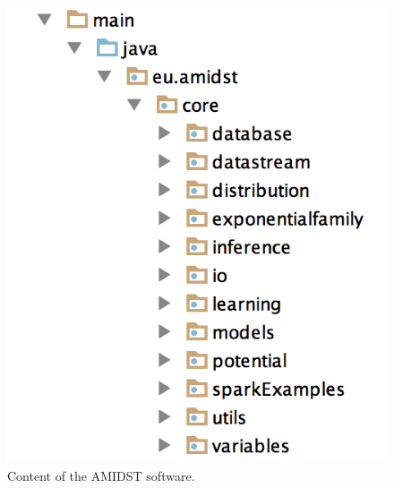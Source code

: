 \begin{figure}[ht!]
\begin{center}
\includegraphics[scale=0.75]{./figures/SoftwareContent}
\caption{\label{Figure:SoftwareContent}Content of the AMIDST software.}
\end{center}
\end{figure}